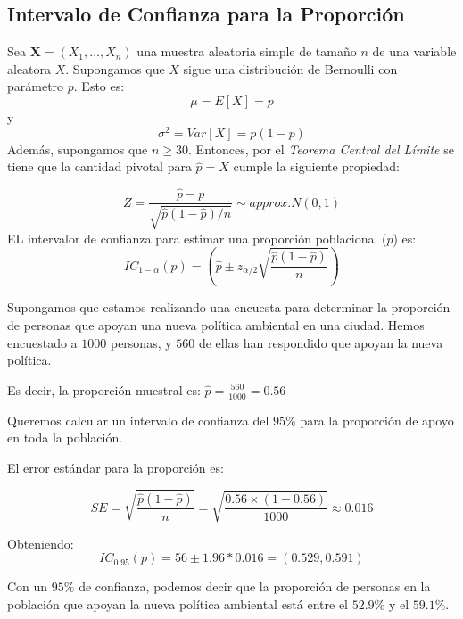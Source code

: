 \documentclass[
  letterpaper,
  DIV=11,
  numbers=noendperiod]{scrreprt}
\begin{document}
\hypertarget{intervalo-de-confianza-para-la-proporciuxf3n}{%
\subsection{Intervalo de Confianza para la
Proporción}\label{intervalo-de-confianza-para-la-proporciuxf3n}}

Sea \(\mathbf{X}=(X_1,\ldots,X_n)\) una muestra aleatoria simple de
tamaño \(n\) de una variable aleatora \(X\). Supongamos que \(X\) sigue
una distribución de Bernoulli con parámetro \(p\). Esto es: \[
\mu=E[X]=p
\] y \[
\sigma^2=Var[X]=p(1-p)
\] Además, supongamos que \(n \geq 30\). Entonces, por el \emph{Teorema
Central del Límite} se tiene que la cantidad pivotal para
\(\hat{p}=\bar{X}\) cumple la siguiente propiedad:

\[
Z=\frac{\hat{p}-p}{\sqrt{\hat{p}(1-\hat{p})/n}}\sim approx. N(0,1)
\] EL intervalor de confianza para estimar una proporción poblacional
(\(p\)) es: \[
IC_{1-\alpha}(p)=\left ( \hat{p} \pm z_{\alpha/2} \sqrt{\frac{\hat{p}(1 - \hat{p})}{n}} \right )
\]

\begin{tcolorbox}[enhanced jigsaw, arc=.35mm, breakable, coltitle=black, left=2mm, opacityback=0, bottomtitle=1mm, colbacktitle=quarto-callout-tip-color!10!white, title=\textcolor{quarto-callout-tip-color}{\faLightbulb}\hspace{0.5em}{Ejemplo. Intervalo de confianza para proporción}, titlerule=0mm, colback=white, colframe=quarto-callout-tip-color-frame, bottomrule=.15mm, rightrule=.15mm, opacitybacktitle=0.6, toptitle=1mm, toprule=.15mm, leftrule=.75mm]

Supongamos que estamos realizando una encuesta para determinar la
proporción de personas que apoyan una nueva política ambiental en una
ciudad. Hemos encuestado a \(1000\) personas, y \(560\) de ellas han
respondido que apoyan la nueva política.

Es decir, la proporción muestral es:
\(\hat{p} = \frac{560}{1000} = 0.56\)

Queremos calcular un intervalo de confianza del \(95\%\) para la
proporción de apoyo en toda la población.

El error estándar para la proporción es:

\[
SE = \sqrt{\frac{\hat{p}(1 - \hat{p})}{n}}=\sqrt{\frac{0.56 \times (1 - 0.56)}{1000}}  \approx 0.016
\]

Obteniendo: \[
IC_{0.95}(p)= 56 \pm 1.96 * 0.016 =  (0.529, 0.591)
\]

Con un \(95\%\) de confianza, podemos decir que la proporción de
personas en la población que apoyan la nueva política ambiental está
entre el \(52.9\%\) y el \(59.1\%\).

\end{tcolorbox}
\end{document}
